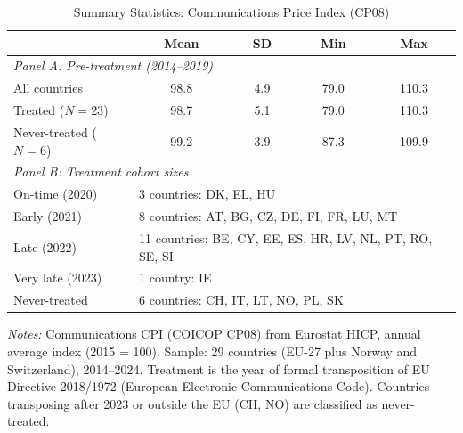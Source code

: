 \begin{table}[htbp]
\centering
\caption{Summary Statistics: Communications Price Index (CP08)}
\label{tab:summary}
\begin{tabular}{lcccc}
\hline\hline
 & Mean & SD & Min & Max \\
\hline
\multicolumn{5}{l}{\textit{Panel A: Pre-treatment (2014--2019)}} \\[3pt]
All countries & 98.8 & 4.9 & 79.0 & 110.3 \\
Treated ($N = 23$) & 98.7 & 5.1 & 79.0 & 110.3 \\
Never-treated ($N = 6$) & 99.2 & 3.9 & 87.3 & 109.9 \\
[6pt]
\multicolumn{5}{l}{\textit{Panel B: Treatment cohort sizes}} \\[3pt]
On-time (2020) & \multicolumn{4}{l}{3 countries: DK, EL, HU} \\
Early (2021) & \multicolumn{4}{l}{8 countries: AT, BG, CZ, DE, FI, FR, LU, MT} \\
Late (2022) & \multicolumn{4}{l}{11 countries: BE, CY, EE, ES, HR, LV, NL, PT, RO, SE, SI} \\
Very late (2023) & \multicolumn{4}{l}{1 country: IE} \\
Never-treated & \multicolumn{4}{l}{6 countries: CH, IT, LT, NO, PL, SK} \\
\hline\hline
\end{tabular}
\begin{tablenotes}[flushleft]
\small
\item \textit{Notes:} Communications CPI (COICOP CP08) from Eurostat HICP, annual average index (2015 = 100). Sample: 29 countries (EU-27 plus Norway and Switzerland), 2014--2024. Treatment is the year of formal transposition of EU Directive 2018/1972 (European Electronic Communications Code). Countries transposing after 2023 or outside the EU (CH, NO) are classified as never-treated.
\end{tablenotes}
\end{table}
